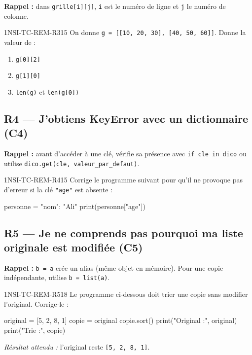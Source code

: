 \textbf{Rappel :} dans \lstinline{grille[i][j]}, \lstinline{i} est le numéro de ligne
et \lstinline{j} le numéro de colonne.

\begin{exercice}{1NSI-TC-REM-R3}{1}{5}
On donne \lstinline{g = [[10, 20, 30], [40, 50, 60]]}. Donne la valeur de :
\begin{enumerate}
  \item \lstinline{g[0][2]}
  \item \lstinline{g[1][0]}
  \item \lstinline{len(g)} et \lstinline{len(g[0])}
\end{enumerate}
\end{exercice}

\subsection*{R4 --- J'obtiens KeyError avec un dictionnaire (C4)}

\textbf{Rappel :} avant d'accéder à une clé, vérifie sa présence avec \lstinline{if cle in dico}
ou utilise \lstinline{dico.get(cle, valeur_par_defaut)}.

\begin{exercice}{1NSI-TC-REM-R4}{1}{5}
Corrige le programme suivant pour qu'il ne provoque pas d'erreur si la clé
\lstinline{"age"} est absente :
\begin{python}
personne = {"nom": "Ali"}
print(personne["age"])
\end{python}
\end{exercice}

\subsection*{R5 --- Je ne comprends pas pourquoi ma liste originale est modifiée (C5)}

\textbf{Rappel :} \lstinline{b = a} crée un alias (même objet en mémoire).
Pour une copie indépendante, utilise \lstinline{b = list(a)}.

\begin{exercice}{1NSI-TC-REM-R5}{1}{8}
Le programme ci-dessous doit trier une copie sans modifier l'original. Corrige-le :
\begin{python}
original = [5, 2, 8, 1]
copie = original
copie.sort()
print("Original :", original)
print("Trie :", copie)
\end{python}
\textit{Résultat attendu :} l'original reste \lstinline{[5, 2, 8, 1]}.
\end{exercice}
